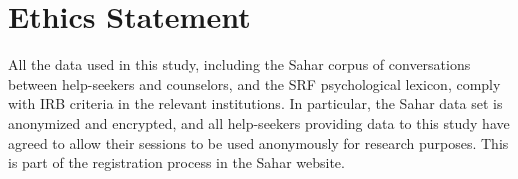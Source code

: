 \documentclass[letterpaper]{article} %
\newcommand{\kibitz}[2]{\ifnum\Comments=1{\textcolor{#1}{#2}}\fi}
\newcommand{\di}[1]{\kibitz{blue}{[DI:#1]}}
\begin{document}




\section{Ethics Statement}
All the data used in this study, including the Sahar corpus of conversations between help-seekers and counselors, and the SRF psychological lexicon, comply with  IRB criteria in the relevant institutions. In particular, the  Sahar data set is anonymized and encrypted, and all help-seekers providing data to this study have agreed to allow their sessions to be used anonymously for research purposes. This is part of the registration process in the Sahar website.


\end{document}
